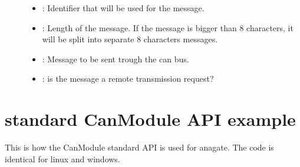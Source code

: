 \documentclass[a4paper,10pt,english]{sphinxmanual}
\begin{document}
\begin{fulllineitems}
\begin{fulllineitems}
\begin{description}
\item[{}] \leavevmode\begin{itemize}
\item {} 
: Identifier that will be used for the message. 

\item {} 
: Length of the message. If the message is bigger than 8 characters, it will be split into separate 8 characters messages. 

\item {} 
: Message to be sent trough the can bus. 

\item {} 
: is the message a remote transmission request? 

\end{itemize}

\end{description}


\end{fulllineitems}


\end{fulllineitems}



\section{standard CanModule API example}
\label{\detokenize{vendors/anagate:standard-canmodule-api-example}}
This is how the CanModule standard API is used for anagate. The code is identical for linux and windows.

\begin{sphinxVerbatim}[commandchars=\\\{\}]
    
      
  
  
\end{sphinxVerbatim}
\end{document}
